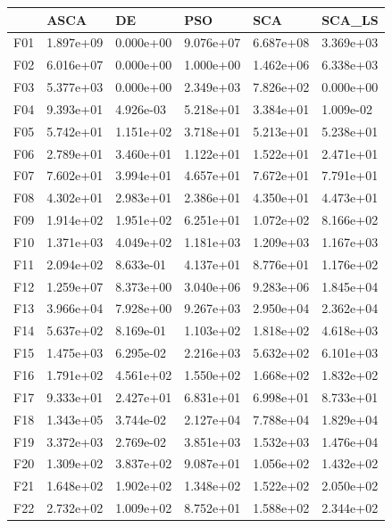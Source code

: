 \begin{tabular}{llllll}
\toprule
{} &       ASCA &         DE &        PSO &        SCA &     SCA\_LS \\
\midrule
F01  &  1.897e+09 &  0.000e+00 &  9.076e+07 &  6.687e+08 &  3.369e+03 \\
F02  &  6.016e+07 &  0.000e+00 &  1.000e+00 &  1.462e+06 &  6.338e+03 \\
F03  &  5.377e+03 &  0.000e+00 &  2.349e+03 &  7.826e+02 &  0.000e+00 \\
F04  &  9.393e+01 &  4.926e-03 &  5.218e+01 &  3.384e+01 &  1.009e-02 \\
F05  &  5.742e+01 &  1.151e+02 &  3.718e+01 &  5.213e+01 &  5.238e+01 \\
F06  &  2.789e+01 &  3.460e+01 &  1.122e+01 &  1.522e+01 &  2.471e+01 \\
F07  &  7.602e+01 &  3.994e+01 &  4.657e+01 &  7.672e+01 &  7.791e+01 \\
F08  &  4.302e+01 &  2.983e+01 &  2.386e+01 &  4.350e+01 &  4.473e+01 \\
F09  &  1.914e+02 &  1.951e+02 &  6.251e+01 &  1.072e+02 &  8.166e+02 \\
F10  &  1.371e+03 &  4.049e+02 &  1.181e+03 &  1.209e+03 &  1.167e+03 \\
F11  &  2.094e+02 &  8.633e-01 &  4.137e+01 &  8.776e+01 &  1.176e+02 \\
F12  &  1.259e+07 &  8.373e+00 &  3.040e+06 &  9.283e+06 &  1.845e+04 \\
F13  &  3.966e+04 &  7.928e+00 &  9.267e+03 &  2.950e+04 &  2.362e+04 \\
F14  &  5.637e+02 &  8.169e-01 &  1.103e+02 &  1.818e+02 &  4.618e+03 \\
F15  &  1.475e+03 &  6.295e-02 &  2.216e+03 &  5.632e+02 &  6.101e+03 \\
F16  &  1.791e+02 &  4.561e+02 &  1.550e+02 &  1.668e+02 &  1.832e+02 \\
F17  &  9.333e+01 &  2.427e+01 &  6.831e+01 &  6.998e+01 &  8.733e+01 \\
F18  &  1.343e+05 &  3.744e-02 &  2.127e+04 &  7.788e+04 &  1.829e+04 \\
F19  &  3.372e+03 &  2.769e-02 &  3.851e+03 &  1.532e+03 &  1.476e+04 \\
F20  &  1.309e+02 &  3.837e+02 &  9.087e+01 &  1.056e+02 &  1.432e+02 \\
F21  &  1.648e+02 &  1.902e+02 &  1.348e+02 &  1.522e+02 &  2.050e+02 \\
F22  &  2.732e+02 &  1.009e+02 &  8.752e+01 &  1.588e+02 &  2.344e+02 \\

\end{tabular}
